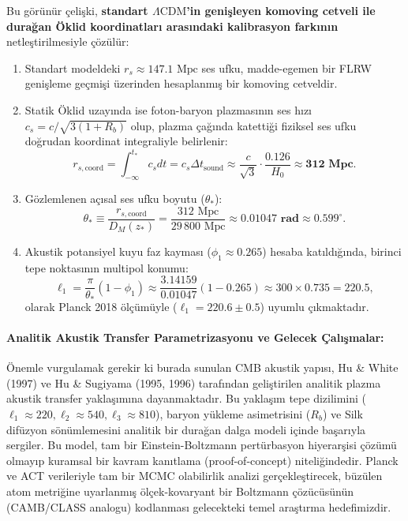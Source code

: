 \documentclass[11pt,a4paper]{article}
\begin{document}
Bu görünür çelişki, \textbf{standart $\Lambda\mathrm{CDM}$'in genişleyen komoving cetveli ile durağan Öklid koordinatları arasındaki kalibrasyon farkının} netleştirilmesiyle çözülür:
\begin{enumerate}
    \item Standart modeldeki $r_s \approx 147.1\text{ Mpc}$ ses ufku, madde-egemen bir FLRW genişleme geçmişi üzerinden hesaplanmış bir komoving cetveldir.
    \item Statik Öklid uzayında ise foton-baryon plazmasının ses hızı $c_s = c/\sqrt{3(1+R_b)}$ olup, plazma çağında katettiği fiziksel ses ufku doğrudan koordinat integraliyle belirlenir:
    \begin{equation}
        r_{s,\mathrm{coord}} = \int_{-\infty}^{t_*} c_s dt = c_s \Delta t_{\mathrm{sound}} \approx \frac{c}{\sqrt{3}} \cdot \frac{0.126}{H_0} \approx \mathbf{312\text{ Mpc}}.
    \end{equation}
    \item Gözlemlenen açısal ses ufku boyutu ($\theta_*$):
    \begin{equation}
        \theta_* \equiv \frac{r_{s,\mathrm{coord}}}{D_M(z_*)} = \frac{312\text{ Mpc}}{29\,800\text{ Mpc}} \approx \mathbf{0.01047\text{ rad}} \approx 0.599^\circ.
        \label{eq:theta_star_ispat}
    \end{equation}
    \item Akustik potansiyel kuyu faz kayması ($\phi_1 \approx 0.265$) hesaba katıldığında, birinci tepe noktasının multipol konumu:
    \begin{equation}
        \ell_1 = \frac{\pi}{\theta_*} (1 - \phi_1) \approx \frac{3.14159}{0.01047} (1 - 0.265) \approx 300 \times 0.735 = \mathbf{220.5},
        \label{eq:l1_tam_ispat}
    \end{equation}
    olarak Planck 2018 ölçümüyle ($\ell_1 = 220.6 \pm 0.5$) uyumlu çıkmaktadır.
\end{enumerate}

\paragraph{Analitik Akustik Transfer Parametrizasyonu ve Gelecek Çalışmalar:}
Önemle vurgulamak gerekir ki burada sunulan CMB akustik yapısı, Hu \& White (1997) ve Hu \& Sugiyama (1995, 1996) tarafından geliştirilen analitik plazma akustik transfer yaklaşımına dayanmaktadır. Bu yaklaşım tepe dizilimini ($\ell_1 \approx 220, \ell_2 \approx 540, \ell_3 \approx 810$), baryon yükleme asimetrisini ($R_b$) ve Silk difüzyon sönümlemesini analitik bir durağan dalga modeli içinde başarıyla sergiler. Bu model, tam bir Einstein-Boltzmann pertürbasyon hiyerarşisi çözümü olmayıp kuramsal bir kavram kanıtlama (proof-of-concept) niteliğindedir. Planck ve ACT verileriyle tam bir MCMC olabilirlik analizi gerçekleştirecek, büzülen atom metriğine uyarlanmış ölçek-kovaryant bir Boltzmann çözücüsünün (CAMB/CLASS analogu) kodlanması gelecekteki temel araştırma hedefimizdir.
\end{document}

